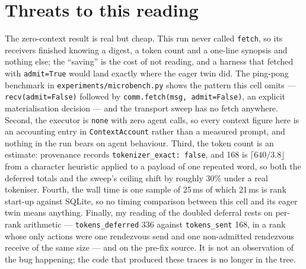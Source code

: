 \documentclass[11pt]{article}
\begin{document}
\section{Threats to this reading}

The zero-context result is real but cheap. This run never called \texttt{fetch}, so
its receivers finished knowing a digest, a token count and a one-line synopsis and
nothing else; the ``saving'' is the cost of not reading, and a harness that fetched
with \texttt{admit=True} would land exactly where the eager twin did. The ping-pong
benchmark in \texttt{experiments/microbench.py} shows the pattern this cell omits ---
\texttt{recv(admit=False)} followed by \texttt{comm.fetch(msg, admit=False)}, an
explicit materialisation decision --- and the transport sweep has no fetch anywhere.
Second, the executor is \texttt{none} with zero agent calls, so every context figure
here is an accounting entry in \texttt{ContextAccount} rather than a measured prompt,
and nothing in the run bears on agent behaviour. Third, the token count is an
estimate: provenance records \texttt{tokenizer\_exact: false}, and 168 is
$\lceil 640/3.8 \rfloor$ from a character heuristic applied to a payload of one
repeated word, so both the deferred totals and the sweep's ceiling shift by roughly
30\% under a real tokeniser. Fourth, the wall time is one sample of 25\,ms of which
21\,ms is rank start-up against SQLite, so no timing comparison between this cell and
its eager twin means anything. Finally, my reading of the doubled deferral rests on
per-rank arithmetic --- \texttt{tokens\_deferred} 336 against \texttt{tokens\_sent}
168, in a rank whose only actions were one rendezvous send and one non-admitted
rendezvous receive of the same size --- and on the pre-fix source. It is not an
observation of the bug happening; the code that produced these traces is no longer in
the tree.
\end{document}
